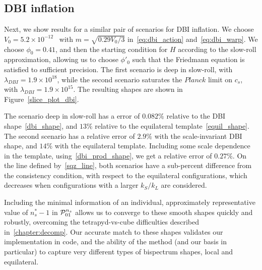 \subsection{DBI inflation}
Next, we show results for a similar pair of scenarios for DBI inflation.
We choose $V_{0}={5.2\times10^{-12}}$~%
with $m=\sqrt{0.29V_0/3}$
in~\eqref{eq:dbi_action} and~\eqref{eq:dbi_warp}.
We choose $\phi_0=0.41$, and then the starting condition
for $H$ according to the slow-roll approximation,
allowing us to choose $\phi'_0$ such that the Friedmann
equation is satisfied to sufficient precision.
The first scenario is deep in slow-roll, with $\lambda_{DBI}=1.9\times10^{18}$, while
the second scenario saturates the $\textit{Planck}$
limit on $c_s$, with $\lambda_{DBI}=1.9\times10^{15}$.
The resulting shapes are shown in Figure~\ref{slice_plot_dbi}.


The scenario deep in slow-roll has a error of $0.082\%$
relative to the DBI shape~\eqref{dbi_shape},
and $13\%$
relative to the equilateral template~\eqref{equil_shape}.
The second scenario has a relative error of $2.9\%$
with the scale-invariant DBI shape, and $14\%$ with the equilateral template.
Including some scale dependence in the template,
using~\eqref{dbi_prod_shape}, we get a relative error of $0.27\%$.
On the line defined by~\eqref{sqz_line},
both scenarios have a sub-percent difference from the
consistency condition, with respect to the equilateral configurations,
which decreases when configurations with a larger $k_S/k_L$ are considered.

Including the minimal information of an individual, approximately
representative value of $n_s^{*}-1$
in $\mathcal{P}^{n_s}_{01}$ allows us to converge to these smooth shapes quickly
and robustly, overcoming the tetrapyd-vs-cube difficulties described
in~\ref{chapter:decomp}. Our accurate match to these shapes validates our
implementation in code, and the ability of the method
(and our basis in particular) to capture very different types of
bispectrum shapes, local and equilateral.


